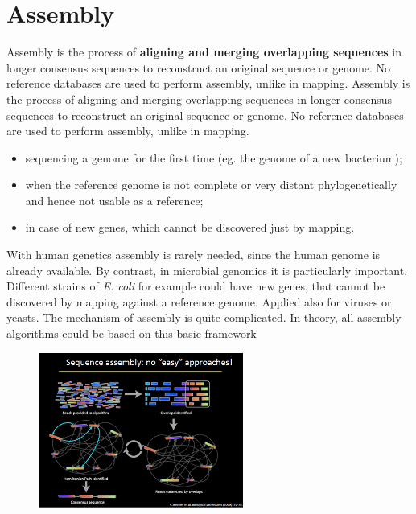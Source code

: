 \graphicspath{{chapters/images/06/}}

\chapter{Assembly}

Assembly is the process of \textbf{aligning and merging overlapping sequences} in longer consensus sequences to reconstruct an original sequence or genome. No reference databases are used to perform assembly, unlike in mapping.
Assembly is the process of aligning and merging overlapping sequences in longer consensus sequences to reconstruct an original sequence or genome. No reference databases are used to perform assembly, unlike in mapping.

\begin{itemize}
    \item sequencing a genome for the first time (eg. the genome of a new bacterium);
    \item when the reference genome is not complete or very distant phylogenetically and hence not usable as a reference;
    \item in case of new genes, which cannot be discovered just by mapping.
\end{itemize}

With human genetics assembly is rarely needed, since the human genome is already available.
By contrast, in microbial genomics it is particularly important. Different strains of \emph{E. coli} for example could have new genes, that cannot be discovered by mapping against a reference genome. Applied also for viruses or yeasts.
The mechanism of assembly is quite complicated.
In theory, all assembly algorithms could be based on this basic framework

\begin{figure}[h]
\centering
\includegraphics[width=0.6\textwidth]{Assembly.png}
\caption{}
\end{figure}

